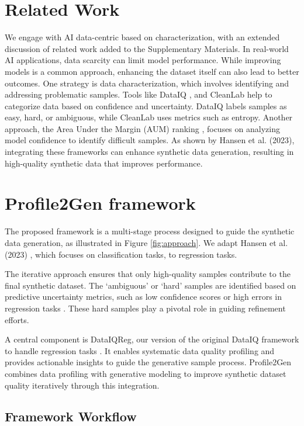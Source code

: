 \documentclass{article}
\theoremstyle{plain}
\theoremstyle{definition}
\theoremstyle{remark}
\begin{document}
\section{Related Work}
We engage with AI data-centric based on characterization, with an extended discussion of related work added to the Supplementary Materials. 
In real-world AI applications, data scarcity can limit model performance. While improving models is a common approach, enhancing the dataset itself can also lead to better outcomes. One strategy is data characterization, which involves identifying and addressing problematic samples. Tools like DataIQ \cite{article}, and CleanLab \cite{unknown} help to categorize data based on confidence and uncertainty. DataIQ labels samples as easy, hard, or ambiguous, while CleanLab uses metrics such as entropy. Another approach, the Area Under the Margin (AUM) ranking \cite{NEURIPS2020_c6102b37}, focuses on analyzing model confidence to identify difficult samples. As shown by Hansen et al. (2023), integrating these frameworks can enhance synthetic data generation, resulting in high-quality synthetic data that improves performance. 

\section{Profile2Gen framework}

The proposed framework is a multi-stage process designed to guide the synthetic data generation, as illustrated in Figure \ref{fig:approach}. We adapt Hansen et al. (2023) \cite{hansen2023reimagining}, which focuses on classification tasks, to regression tasks. 


The iterative approach ensures that only high-quality samples contribute to the final synthetic dataset. The `ambiguous' or `hard' samples are identified based on predictive uncertainty metrics, such as low confidence scores or high errors in regression tasks \cite{unknown}. These hard samples play a pivotal role in guiding refinement efforts.

A central component is DataIQReg, our version of the original DataIQ framework \cite{unknown} to handle regression tasks \cite{article}. It enables systematic data quality profiling and provides actionable insights to guide the generative sample process. Profile2Gen combines data profiling with generative modeling to improve synthetic dataset quality iteratively through this integration.


\subsection{Framework Workflow} \label{subsec:workflow}
\end{document}
